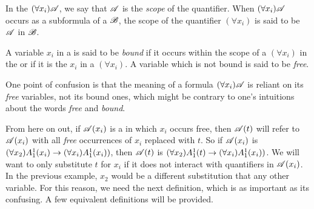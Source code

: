 \setcounter{definition}{7}
\begin{definition}
  In the \wf{} \((\forall x_i)\mathscr{A}\), we say that \(\mathscr{A}\) is the \textit{scope} of the quantifier. When \((\forall x_i)\mathscr{A}\) occurs as a subformula of a \wf{} \(\mathscr{B}\), the scope of the quantifier \((\forall x_i)\) is said to be \(\mathscr{A}\) in \(\mathscr{B}\).

  A variable \(x_i\) in a \wf{} is said to be \textit{bound} if it occurs within the scope of a \((\forall x_i)\) in the \wf{} or if it is the \(x_i\) in a \((\forall x_i)\). A variable which is not bound is said to be \textit{free}.

  \note{} One point of confusion is that the meaning of a formula \((\forall x_i) \mathscr{A}\) is reliant on its \textit{free} variables, not its bound ones, which might be contrary to one's intuitions about the words \textit{free} and \textit{bound}.
\end{definition}

From here on out, if \(\mathscr{A}(x_i)\) is a \wf{} in which \(x_i\) occurs free, then \(\mathscr{A}(t)\) will refer to \(\mathscr{A}(x_i)\) with all \textit{free} occurrences of \(x_i\) replaced with \(t\). So if \(\mathscr{A}(x_i)\) is \((\forall x_2) A^1_1(x_i) \rightarrow (\forall x_i) A^1_1(x_i))\), then \(\mathscr{A}(t)\) is \((\forall x_2) A^1_1(t) \rightarrow (\forall x_i) A^1_1(x_i))\). We will want to only substitute \(t\) for \(x_i\) if it does not interact with quantifiers in \(\mathscr{A}(x_i)\). In the previous example, \(x_2\) would be a different substitution that any other variable. For this reason, we need the next definition, which is as important as its confusing. A few equivalent definitions will be provided.

